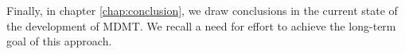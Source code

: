 Finally, in chapter \ref{chap:conclusion}, we draw conclusions in the current state of the development of MDMT. We recall a need for effort to achieve the long-term goal of this approach.
















































































